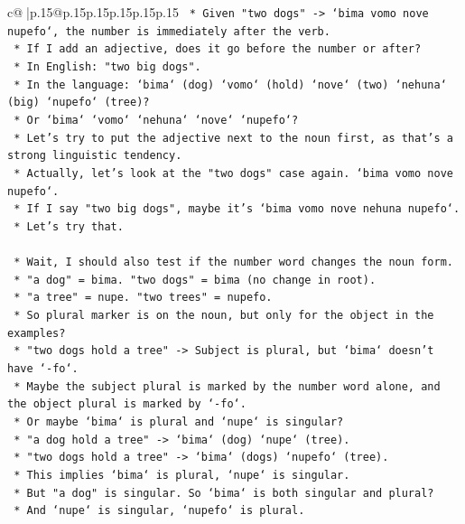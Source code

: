 \documentclass{article}
\begin{document}
{\begin{supertabular}{c@{$\;$}|p{.15\linewidth}@{}p{.15\linewidth}p{.15\linewidth}p{.15\linewidth}p{.15\linewidth}p{.15\linewidth}}
{{{\texttt{    *   Given "two dogs" {-}> `bima vomo nove nupefo`, the number is immediately after the verb.} \\
\texttt{    *   If I add an adjective, does it go before the number or after?} \\
\texttt{    *   In English: "two big dogs".} \\
\texttt{    *   In the language: `bima` (dog) `vomo` (hold) `nove` (two) `nehuna` (big) `nupefo` (tree)?} \\
\texttt{    *   Or `bima` `vomo` `nehuna` `nove` `nupefo`?} \\
\texttt{    *   Let's try to put the adjective next to the noun first, as that's a strong linguistic tendency.} \\
\texttt{    *   Actually, let's look at the "two dogs" case again. `bima vomo nove nupefo`.} \\
\texttt{    *   If I say "two big dogs", maybe it's `bima vomo nove nehuna nupefo`.} \\
\texttt{    *   Let's try that.} \\
\\ 
\texttt{    *   Wait, I should also test if the number word changes the noun form.} \\
\texttt{    *   "a dog" = bima. "two dogs" = bima (no change in root).} \\
\texttt{    *   "a tree" = nupe. "two trees" = nupefo.} \\
\texttt{    *   So plural marker is on the noun, but only for the object in the examples?} \\
\texttt{    *   "two dogs hold a tree" {-}> Subject is plural, but `bima` doesn't have `{-}fo`.} \\
\texttt{    *   Maybe the subject plural is marked by the number word alone, and the object plural is marked by `{-}fo`.} \\
\texttt{    *   Or maybe `bima` is plural and `nupe` is singular?} \\
\texttt{    *   "a dog hold a tree" {-}> `bima` (dog) `nupe` (tree).} \\
\texttt{    *   "two dogs hold a tree" {-}> `bima` (dogs) `nupefo` (tree).} \\
\texttt{    *   This implies `bima` is plural, `nupe` is singular.} \\
\texttt{    *   But "a dog" is singular. So `bima` is both singular and plural?} \\
\texttt{    *   And `nupe` is singular, `nupefo` is plural.} \\
}}}
\end{supertabular}}
\end{document}
